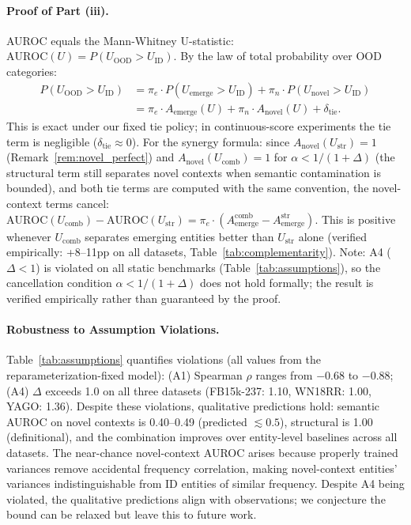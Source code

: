 \documentclass{article}
\begin{document}
\paragraph{Proof of Part (iii).}
AUROC equals the Mann-Whitney U-statistic: $\text{AUROC}(U) = P(U_{\text{OOD}} > U_{\text{ID}})$. By the law of total probability over OOD categories:
\begin{align}
P(U_{\text{OOD}} > U_{\text{ID}}) &= \pi_e \cdot P(U_{\text{emerge}} > U_{\text{ID}}) + \pi_n \cdot P(U_{\text{novel}} > U_{\text{ID}}) \nonumber \\
&= \pi_e \cdot A_{\text{emerge}}(U) + \pi_n \cdot A_{\text{novel}}(U) + \delta_{\text{tie}}.
\end{align}
This is exact under our fixed tie policy; in continuous-score experiments the tie term is negligible ($\delta_{\text{tie}}\approx 0$). For the synergy formula: since $A_{\text{novel}}(U_{\text{str}}) = 1$ (Remark~\ref{rem:novel_perfect}) and $A_{\text{novel}}(U_{\text{comb}}) = 1$ for $\alpha < 1/(1{+}\Delta)$ (the structural term still separates novel contexts when semantic contamination is bounded), and both tie terms are computed with the same convention, the novel-context terms cancel:
$\text{AUROC}(U_{\text{comb}}) - \text{AUROC}(U_{\text{str}}) = \pi_e \cdot (A_{\text{emerge}}^{\text{comb}} - A_{\text{emerge}}^{\text{str}})$.
This is positive whenever $U_{\text{comb}}$ separates emerging entities better than $U_{\text{str}}$ alone (verified empirically: +8--11pp on all datasets, Table~\ref{tab:complementarity}). Note: A4 ($\Delta < 1$) is violated on all static benchmarks (Table~\ref{tab:assumptions}), so the cancellation condition $\alpha < 1/(1+\Delta)$ does not hold formally; the result is verified empirically rather than guaranteed by the proof.

\paragraph{Robustness to Assumption Violations.}
Table~\ref{tab:assumptions} quantifies violations (all values from the reparameterization-fixed model): (A1) Spearman $\rho$ ranges from $-0.68$ to $-0.88$; (A4) $\Delta$ exceeds 1.0 on all three datasets (FB15k-237: 1.10, WN18RR: 1.00, YAGO: 1.36). Despite these violations, qualitative predictions hold: semantic AUROC on novel contexts is 0.40--0.49 (predicted $\lesssim 0.5$), structural is 1.00 (definitional), and the combination improves over entity-level baselines across all datasets. The near-chance novel-context AUROC arises because properly trained variances remove accidental frequency correlation, making novel-context entities' variances indistinguishable from ID entities of similar frequency. Despite A4 being violated, the qualitative predictions align with observations; we conjecture the bound can be relaxed but leave this to future work.
\end{document}
